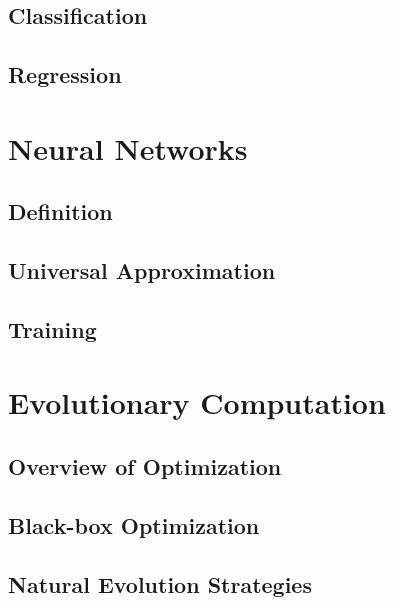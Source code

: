 \subsection{Classification}
\subsection{Regression}

\section{Neural Networks}
\subsection{Definition}
\subsection{Universal Approximation}
\subsection{Training}

\section{Evolutionary Computation}
\subsection{Overview of Optimization}
\subsection{Black-box Optimization}
\subsection{Natural Evolution Strategies}